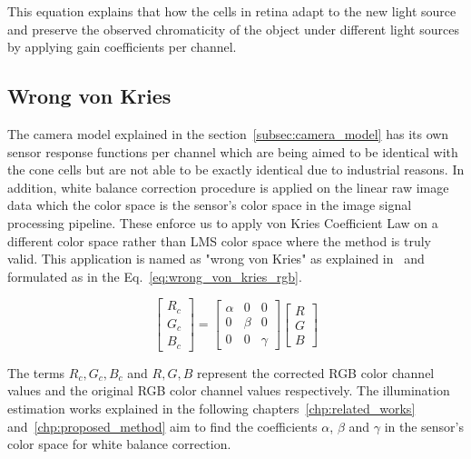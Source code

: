 This equation explains that how the cells in retina adapt to the new light source and preserve the observed chromaticity of the object under different light sources by applying gain coefficients per channel.

\subsection{Wrong von Kries}

The camera model explained in the section~\ref{subsec:camera_model} has its own sensor response functions per channel which are being aimed to be identical with the cone cells but are not able to be exactly identical due to industrial reasons. In addition, white balance correction procedure is applied on the linear raw image data which the color space is the sensor's color space in the image signal processing pipeline. These enforce us to apply von Kries Coefficient Law on a different color space rather than LMS color space where the method is truly valid. This application is named as "wrong von Kries" as explained in~\cite{reinhard2008color} and formulated as in the Eq.~\ref{eq:wrong_von_kries_rgb}.

\begin{equation}
    \begin{bmatrix} 
    R_c \\ 
    G_c \\ 
    B_c 
    \end{bmatrix} = 
    \begin{bmatrix} 
    \alpha & 0 & 0 \\ 
    0 & \beta & 0 \\ 
    0 & 0 & \gamma 
    \end{bmatrix} 
    \begin{bmatrix} 
    R \\ 
    G \\ 
    B 
    \end{bmatrix}
    \label{eq:wrong_von_kries_rgb}
\end{equation}

The terms $R_c,G_c,B_c$ and $R,G,B$ represent the corrected RGB color channel values and the original RGB color channel values respectively. The illumination estimation works explained in the following chapters~\ref{chp:related_works} and~\ref{chp:proposed_method} aim to find the coefficients $\alpha$, $\beta$ and $\gamma$ in the sensor's color space for white balance correction.